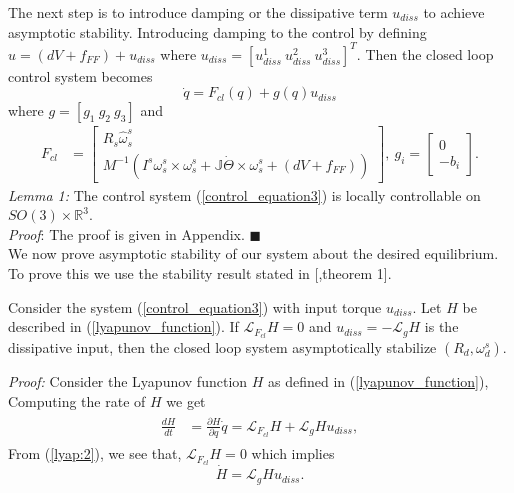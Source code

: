 \documentclass{ifacconf}
\begin{document}
The next step is to introduce damping or the dissipative term $u_{diss}$ to achieve asymptotic stability. Introducing damping to the control by defining $u = (dV + f_{FF}) + u_{diss}$ 
where $u_{diss} = [u^{1}_{diss}~ u^{2}_{diss}~ u^{3}_{diss}]^{T}$. Then the closed loop control system becomes 
\begin{equation}\label{control_equation3}
\dot{q} = F_{cl}(q) + g(q)u_{diss}
\end{equation}
where $g = [g_{1}~g_{2}~g_{3}]$ and
\begin{align*}
F_{cl} & = \begin{bmatrix}
R_{s}\widehat{\omega}_{s}^{s} \\
M^{-1}\left( I^{s}\omega_{s}^{s} \times \omega_{s}^{s} + \mathbb{J}\dot{\Theta} \times \omega_{s}^{s} + (dV + f_{FF})\right) 
\end{bmatrix},~ g_{i} = \begin{bmatrix}
0 \\
-b_{i}
\end{bmatrix}.
\end{align*}
\textit{Lemma 1:} The control system (\ref{control_equation3}) is locally controllable on $SO(3) \times \mathbb{R}^{3}$.\\
\textit{Proof}: The proof is given in Appendix. $\blacksquare$ \\
We now prove asymptotic stability of our system about the desired equilibrium. To prove this we use the stability result stated in [\citep{bullo_stability},theorem 1].
\begin{thm}\label{theorem2}
Consider the system (\ref{control_equation3}) with input torque $u_{diss}$. Let $H$ be described in (\ref{lyapunov_function}). If $\mathcal{L}_{F_{cl}}H = 0$ and $u_{diss} = - \mathcal{L}_{g}H$ is the dissipative input, then the closed loop system asymptotically stabilize $(R_{d}, \omega_{d}^{s})$.
\end{thm}
\textit{Proof:} Consider the Lyapunov function $H$ as defined in (\ref{lyapunov_function}), Computing the rate of $H$ we get
\begin{align}\nonumber
\begin{split}
\frac{dH}{dt}& = \frac{\partial H}{\partial q} \dot{q} = \mathcal{L}_{F_{cl}}H + \mathcal{L}_{g}H u_{diss},
\end{split}
\end{align}
From (\ref{lyap:2}), we see that, $\mathcal{L}_{F_{cl}}H = 0$ which implies
\begin{equation}\label{asymptotic_H}
\dot{H} = \mathcal{L}_{g}H u_{diss}.
\end{equation}
\end{document}
